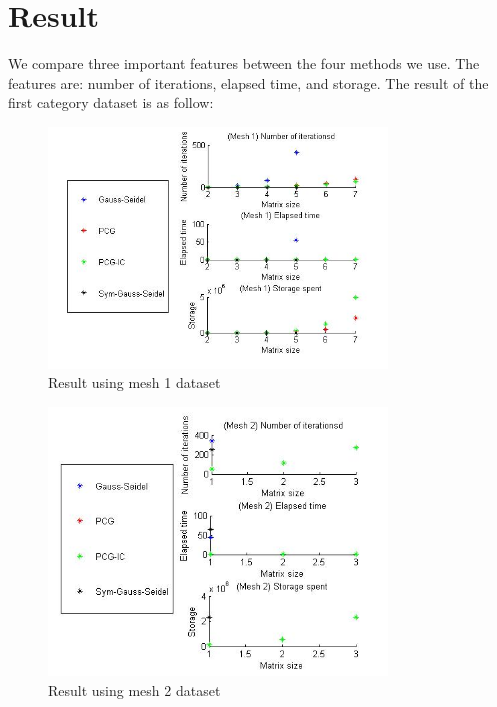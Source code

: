 \documentclass{article}
\begin{document}
\newpage
\section{Result}

We compare three important features between the four methods we use. The features are: number of iterations, elapsed time, and storage. The result of the first category dataset is as follow:
\begin{figure}[ht!]
\centering
\includegraphics[width=90mm]{mesh1result.jpg}
\caption{Result using mesh 1 dataset}
\label{overflow}
\end{figure}
\begin{figure}[ht!]
\centering
\includegraphics[width=90mm]{mesh2result.jpg}
\caption{Result using mesh 2 dataset}
\label{overflow}
\end{figure}
\end{document}
